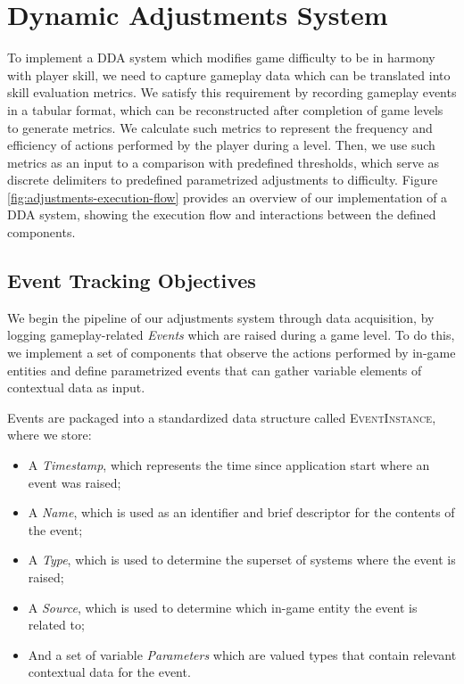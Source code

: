 

\section{Dynamic Adjustments System}

To implement a DDA system which modifies game difficulty to be in harmony with player skill, we need to capture gameplay data which can be translated into skill evaluation metrics. We satisfy this requirement by recording gameplay events in a tabular format, which can be reconstructed after completion of game levels to generate metrics. We calculate such metrics to represent the frequency and efficiency of actions performed by the player during a level. Then, we use such metrics as an input to a comparison with predefined thresholds, which serve as discrete delimiters to predefined parametrized adjustments to difficulty. Figure \ref{fig:adjustments-execution-flow} provides an overview of our implementation of a DDA system, showing the execution flow and interactions between the defined components.



\subsection{Event Tracking Objectives}

We begin the pipeline of our adjustments system through data acquisition, by logging gameplay-related \emph{Events} which are raised during a game level. To do this, we implement a set of components that observe the actions performed by in-game entities and define parametrized events that can gather variable elements of contextual data as input.

Events are packaged into a standardized data structure called \textsc{EventInstance}, where we store: 
\begin{itemize}
    \item{A \emph{Timestamp}, which represents the time since application start where an event was raised;}
    \item{A \emph{Name}, which is used as an identifier and brief descriptor for the contents of the event;}
    \item{A \emph{Type}, which is used to determine the superset of systems where the event is raised;}
    \item{A \emph{Source}, which is used to determine which in-game entity the event is related to;}
    \item{And a set of variable \emph{Parameters} which are valued types that contain relevant contextual data for the event.}
\end{itemize}

